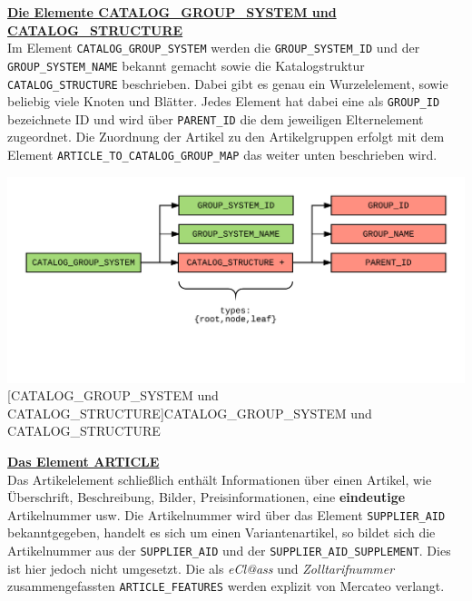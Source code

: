 	
	
	\textbf{\underline{Die Elemente CATALOG\_GROUP\_SYSTEM und CATALOG\_STRUCTURE}}\\
	
	Im Element \texttt{CATALOG\_GROUP\_SYSTEM} werden die \texttt{GROUP\_SYSTEM\_ID} und der \texttt{GROUP\_SYSTEM\_NAME} bekannt gemacht sowie die Katalogstruktur  \texttt{CATALOG\_STRUCTURE}   beschrieben. Dabei gibt es genau ein Wurzelelement, sowie beliebig viele Knoten und Blätter. Jedes Element hat dabei eine als \texttt{GROUP\_ID} bezeichnete ID und wird über \texttt{PARENT\_ID} die  dem jeweiligen Elternelement zugeordnet. Die Zuordnung der Artikel zu den Artikelgruppen erfolgt mit dem Element \texttt{ARTICLE\_TO\_CATALOG\_GROUP\_MAP} das weiter unten beschrieben wird.
	
	\begin{minipage}{\linewidth}
		\vspace{1em}
		\centering
		\includegraphics[width=0.6\linewidth]{img/catalogGroupSystem}
		[CATALOG\_GROUP\_SYSTEM und CATALOG\_STRUCTURE]{CATALOG\_GROUP\_SYSTEM und CATALOG\_STRUCTURE}
		\label{fig:header}
		\vspace{1em}
	\end{minipage} 
	
	\textbf{\underline{Das Element ARTICLE}}\\
	Das Artikelelement schließlich enthält Informationen über einen Artikel, wie Überschrift, Beschreibung, Bilder, Preisinformationen, eine \textbf{eindeutige} Artikelnummer usw. Die Artikelnummer wird über das Element \texttt{SUPPLIER\_AID} bekanntgegeben, handelt es sich um einen Variantenartikel, so bildet sich die Artikelnummer aus der \texttt{SUPPLIER\_AID} und der \texttt{SUPPLIER\_AID\_SUPPLEMENT}. Dies ist hier jedoch nicht umgesetzt. Die als \textit{eCl@ass} und \textit{Zolltarifnummer} zusammengefassten \texttt{ARTICLE\_FEATURES} werden explizit von Mercateo verlangt.
	

